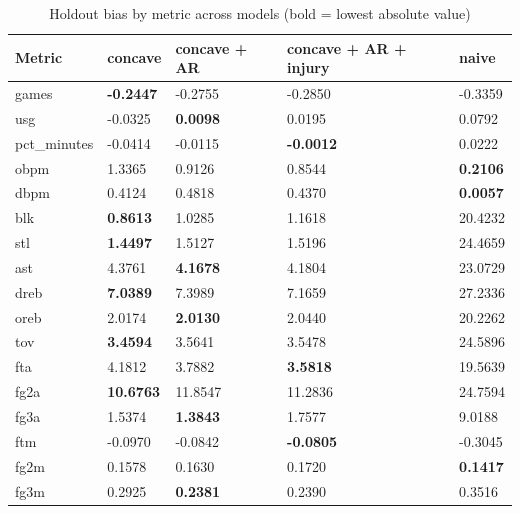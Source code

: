 \begin{table}
\caption{Holdout bias by metric across models (bold = lowest absolute value)}
\label{tab:holdout_bias_all_models}
\begin{tabular}{lllll}
\toprule
Metric & concave & concave + AR & concave + AR + injury & naive \\
\midrule
games & \textbf{-0.2447} & -0.2755 & -0.2850 & -0.3359 \\
usg & -0.0325 & \textbf{0.0098} & 0.0195 & 0.0792 \\
pct_minutes & -0.0414 & -0.0115 & \textbf{-0.0012} & 0.0222 \\
obpm & 1.3365 & 0.9126 & 0.8544 & \textbf{0.2106} \\
dbpm & 0.4124 & 0.4818 & 0.4370 & \textbf{0.0057} \\
blk & \textbf{0.8613} & 1.0285 & 1.1618 & 20.4232 \\
stl & \textbf{1.4497} & 1.5127 & 1.5196 & 24.4659 \\
ast & 4.3761 & \textbf{4.1678} & 4.1804 & 23.0729 \\
dreb & \textbf{7.0389} & 7.3989 & 7.1659 & 27.2336 \\
oreb & 2.0174 & \textbf{2.0130} & 2.0440 & 20.2262 \\
tov & \textbf{3.4594} & 3.5641 & 3.5478 & 24.5896 \\
fta & 4.1812 & 3.7882 & \textbf{3.5818} & 19.5639 \\
fg2a & \textbf{10.6763} & 11.8547 & 11.2836 & 24.7594 \\
fg3a & 1.5374 & \textbf{1.3843} & 1.7577 & 9.0188 \\
ftm & -0.0970 & -0.0842 & \textbf{-0.0805} & -0.3045 \\
fg2m & 0.1578 & 0.1630 & 0.1720 & \textbf{0.1417} \\
fg3m & 0.2925 & \textbf{0.2381} & 0.2390 & 0.3516 \\
\bottomrule
\end{tabular}
\end{table}
